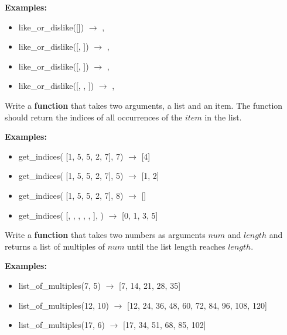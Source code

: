 		\textbf{Examples:}		
		\begin{itemize}
			\item  like\_or\_dislike([]) $\rightarrow$ ,
			\item  like\_or\_dislike([\csq{like}, ]) $\rightarrow$ ,
			\item  like\_or\_dislike([, ]) $\rightarrow$ ,
			\item  like\_or\_dislike([, \csq{dislike}, ]) $\rightarrow$ ,
		\end{itemize}




	\item
		Write a \textbf{function} that takes two arguments, a list and an item.  The function should return the indices of all occurrences of the $item$ in the list.

		\textbf{Examples:}		
		\begin{itemize}
			\item  get\_indices( [1, 5, 5, 2, 7], 7) $\rightarrow$ [4]
			\item  get\_indices( [1, 5, 5, 2, 7], 5) $\rightarrow$ [1, 2]
			\item  get\_indices( [1, 5, 5, 2, 7], 8) $\rightarrow$ []
			\item  get\_indices( [\csq{a}, , , , , \csq{a}], ) 
				$\rightarrow$ [0, 1, 3, 5]
		\end{itemize}


	\item
		Write a \textbf{function} that takes two numbers as arguments $num$ and $length$ and returns a 
		list of multiples of $num$ until the list length reaches $length$.

		\textbf{Examples:}		
		\begin{itemize}
			\item  list\_of\_multiples(7, 5) $\rightarrow$ [7, 14, 21, 28, 35]
			\item  list\_of\_multiples(12, 10) $\rightarrow$ [12, 24, 36, 48, 60, 72, 84, 96, 108, 120]
			\item  list\_of\_multiples(17, 6) $\rightarrow$ [17, 34, 51, 68, 85, 102]
		\end{itemize}


